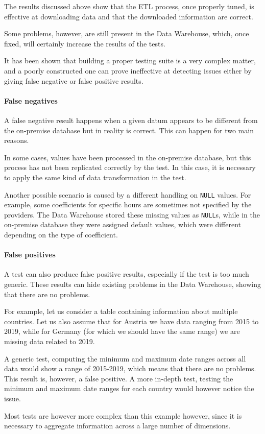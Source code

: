 The results discussed above show that the ETL process, once properly tuned, is effective at downloading data and that the downloaded information are correct.

Some problems, however, are still present in the Data Warehouse, which, once fixed, will certainly increase the results of the tests.

It has been shown that building a proper testing suite is a very complex matter, and a poorly constructed one can prove ineffective at detecting issues either by giving false negative or false positive results.

\paragraph{False negatives}
    A false negative result happens when a given datum appears to be different from the on-premise database but in reality is correct.
    This can happen for two main reasons.
    
    In some cases, values have been processed in the on-premise database, but this process has not been replicated correctly by the test.
    In this case, it is necessary to apply the same kind of data transformation in the test.
    
    Another possible scenario is caused by a different handling on \texttt{NULL} values.
    For example, some coefficients for specific hours are sometimes not specified by the providers.
    The Data Warehouse stored these missing values as \texttt{NULL}s, while in the on-premise database they were assigned default values, which were different depending on the type of coefficient.
    
\paragraph{False positives}
    A test can also produce false positive results, especially if the test is too much generic.
    These results can hide existing problems in the Data Warehouse, showing that there are no problems.
    
    For example, let us consider a table containing information about multiple countries.
    Let us also assume that for Austria we have data ranging from 2015 to 2019, while for Germany (for which we should have the same range) we are missing data related to 2019.
    
    A generic test, computing the minimum and maximum date ranges across all data would show a range of 2015-2019, which means that there are no problems.
    This result is, however, a false positive.
    A more in-depth test, testing the minimum and maximum date ranges for each country would however notice the issue.
    
    Most tests are however more complex than this example however, since it is necessary to aggregate information across a large number of dimensions.
    